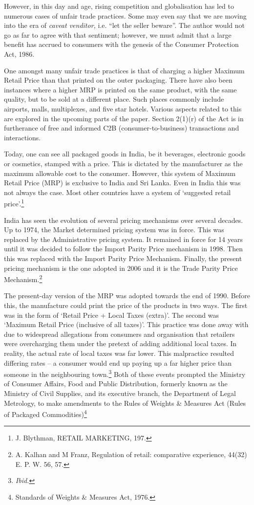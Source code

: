 \begin{multicols}{2}
\noi
However, in this day and age, rising competition and globalisation has led to numerous cases
of unfair trade practices. Some may even say that we are moving into the era of \textit{caveat venditor,}
i.e. “let the seller beware”. The author would not go as far to agree with that sentiment;
however, we must admit that a large benefit has accrued to consumers with the genesis of the
Consumer Protection Act, 1986.

\noi
One amongst many unfair trade practices is that of charging a higher Maximum Retail Price
than that printed on the outer packaging. There have also been instances where a higher MRP
is printed on the same product, with the same quality, but to be sold at a different place. Such
places commonly include airports, malls, multiplexes, and five star hotels. Various aspects related to this are explored in the upcoming parts of the paper. Section 2(1)(r) of the Act is in
furtherance of free and informed C2B (consumer-to-business) transactions and interactions.


\noi
Today, one can see all packaged goods in India, be it beverages, electronic goods or cosmetics,
stamped with a price. This is dictated by the manufacturer as the maximum allowable cost to
the consumer. However, this system of Maximum Retail Price (MRP) is exclusive to India and
Sri Lanka. Even in India this was not always the case. Most other countries have a system of
‘suggested retail price’.\footnote{J. Blythman, RETAIL MARKETING, 197.}

\noi
India has seen the evolution of several pricing mechanisms over several decades. Up to 1974,
the Market determined pricing system was in force. This was replaced by the Administrative
pricing system. It remained in force for 14 years until it was decided to follow the Import Parity
Price mechanism in 1998. Then this was replaced with the Import Parity Price Mechanism.
Finally, the present pricing mechanism is the one adopted in 2006 and it is the Trade Parity
Price Mechanism.\footnote{A. Kalhan and M Franz, Regulation of retail: comparative experience, 44(32) E. P. W. 56, 57.}

\noi
The present-day version of the MRP was adopted towards the end of 1990. Before this, the
manufacture could print the price of the products in two ways. The first was in the form of
‘Retail Price + Local Taxes (extra)’. The second was ‘Maximum Retail Price (inclusive of all
taxes)’. This practice was done away with due to widespread allegations from consumers and
organisation that retailers were overcharging them under the pretext of adding additional local
taxes. In reality, the actual rate of local taxes was far lower. This malpractice resulted differing
rates – a consumer would end up paying up a far higher price than someone in the neighbouring
town.\footnote{\textit{Ibid.}} Both of these events prompted the Ministry of Consumer Affairs, Food and Public
Distribution, formerly known as the Ministry of Civil Supplies, and its executive branch, the
Department of Legal Metrology, to make amendments to the Rules of Weights \& Measures
Act (Rules of Packaged Commodities)\footnote{Standards of Weights \& Measures Act, 1976.}


\end{multicols}
